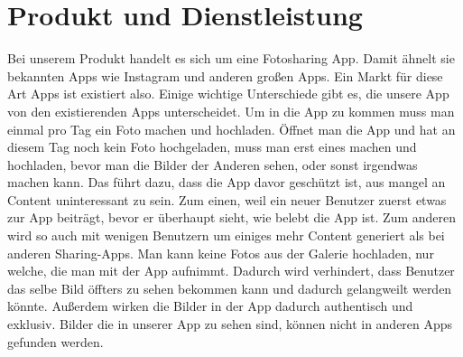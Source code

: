 \chapter{Produkt und Dienstleistung}

Bei unserem Produkt handelt es sich um eine Fotosharing App. Damit ähnelt sie bekannten Apps wie Instagram und anderen großen Apps. Ein Markt für diese Art Apps ist existiert also. Einige wichtige Unterschiede gibt es, die unsere App von den existierenden Apps unterscheidet.
Um in die App zu kommen muss man einmal pro Tag ein Foto machen und hochladen. Öffnet man die App und hat an diesem Tag noch kein Foto hochgeladen, muss man erst eines machen und hochladen, bevor man die Bilder der Anderen sehen, oder sonst irgendwas machen kann. Das führt dazu, dass die App davor geschützt ist, aus mangel an Content uninteressant zu sein. Zum einen, weil ein neuer Benutzer zuerst etwas zur App beiträgt, bevor er überhaupt sieht, wie belebt die App ist. Zum anderen wird so auch mit wenigen Benutzern um einiges mehr Content generiert als bei anderen Sharing-Apps.
Man kann keine Fotos aus der Galerie hochladen, nur welche, die man mit der App aufnimmt. Dadurch wird verhindert, dass Benutzer das selbe Bild öffters zu sehen bekommen kann und dadurch gelangweilt werden könnte. Außerdem wirken die Bilder in der App dadurch authentisch und exklusiv. Bilder die in unserer App zu sehen sind, können nicht in anderen Apps gefunden werden.

